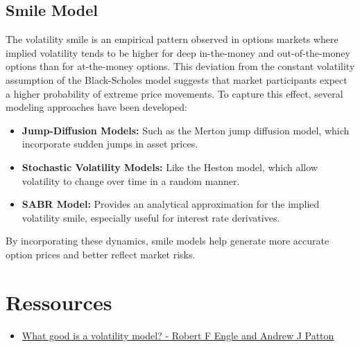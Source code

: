 \documentclass[letterpaper,11pt]{article}
\begin{document}
\subsection{Smile Model}
The volatility smile is an empirical pattern observed in options markets where implied volatility tends to be higher for deep in-the-money and out-of-the-money options than for at-the-money options. This deviation from the constant volatility assumption of the Black-Scholes model suggests that market participants expect a higher probability of extreme price movements. To capture this effect, several modeling approaches have been developed:
\begin{itemize}
    \item \textbf{Jump-Diffusion Models:} Such as the Merton jump diffusion model, which incorporate sudden jumps in asset prices.
    \item \textbf{Stochastic Volatility Models:} Like the Heston model, which allow volatility to change over time in a random manner.
    \item \textbf{SABR Model:} Provides an analytical approximation for the implied volatility smile, especially useful for interest rate derivatives.
\end{itemize}
By incorporating these dynamics, smile models help generate more accurate option prices and better reflect market risks.


\newpage

\section{Ressources}
\begin{itemize}
    \item \href{https://web-static.stern.nyu.edu/rengle/EnglePattonQF.pdf}{What good is a volatility model? - Robert F Engle and Andrew J Patton}
\end{itemize}



\end{document}
